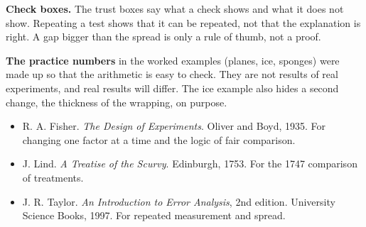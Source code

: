\textbf{Check boxes.} The trust boxes say what a check shows and what it does not show. Repeating a test shows that it can be repeated, not that the explanation is right. A gap bigger than the spread is only a rule of thumb, not a proof.

\textbf{The practice numbers} in the worked examples (planes, ice, sponges) were made up so that the arithmetic is easy to check. They are not results of real experiments, and real results will differ. The ice example also hides a second change, the thickness of the wrapping, on purpose.

\begin{itemize}[leftmargin=1.3em,itemsep=0.2em]
\item R. A. Fisher. \emph{The Design of Experiments}. Oliver and Boyd, 1935. For changing one factor at a time and the logic of fair comparison.
\item J. Lind. \emph{A Treatise of the Scurvy}. Edinburgh, 1753. For the 1747 comparison of treatments.
\item J. R. Taylor. \emph{An Introduction to Error Analysis}, 2nd edition. University Science Books, 1997. For repeated measurement and spread.
\end{itemize}

\clearpage
\thispagestyle{blank}
